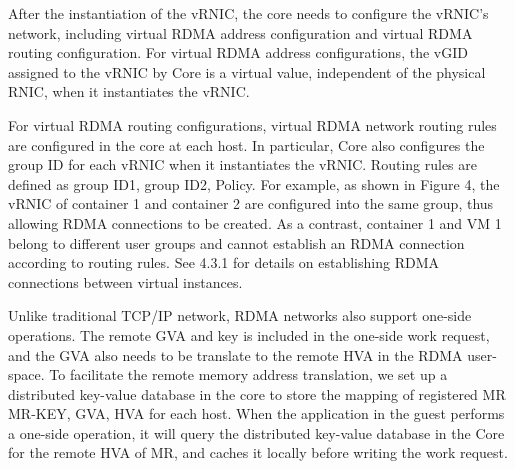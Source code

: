 After the instantiation of the vRNIC, the \sys core needs to configure the vRNIC's network, including virtual RDMA address configuration and virtual RDMA routing configuration.
For virtual RDMA address configurations, the vGID assigned to the vRNIC by \sys Core is a virtual value, independent of the physical RNIC, when it instantiates the vRNIC.


For virtual RDMA routing configurations, virtual RDMA network routing rules are configured in the \sys core at each host. In particular, \sys Core also configures the group ID for each vRNIC when it instantiates the vRNIC. Routing rules are defined as {group ID1, group ID2, Policy}. For example, as shown in Figure 4, the vRNIC of container 1 and container 2 are configured into the same group, thus allowing RDMA connections to be created. As a contrast, container 1 and VM 1 belong to different user groups and cannot establish an RDMA connection according to routing rules. See 4.3.1 for details on establishing RDMA connections between virtual instances.


Unlike traditional TCP/IP network, RDMA networks also support one-side operations. The remote GVA and key is included in the one-side work request, and the GVA also needs to be translate to the remote HVA in the RDMA user-space. To facilitate the remote memory address translation, we set up a distributed key-value database in the \sys core to store the mapping of registered MR {MR-KEY, GVA, HVA} for each host. When the application in the guest performs a one-side operation, it will query the distributed key-value database in the \sys Core for the remote HVA of MR, and caches it locally before writing the work request.

